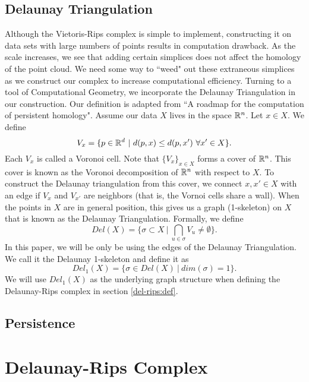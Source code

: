 \documentclass[letterpaper,titlepage]{article}
\begin{document}
\subsection{Delaunay Triangulation}
Although the Vietoris-Rips complex is simple to implement, constructing it on data sets with large numbers of points results in computation drawback. As the scale increases, we see that adding certain simplices does not affect the homology of the point cloud. We need some way to ``weed" out these extraneous simplices as we construct our complex to increase computational efficiency. Turning to a tool of Computational Geometry, we incorporate the Delaunay Triangulation in our construction. Our definition is adapted from ``A roadmap for the computation of persistent homology"\cite{Roadmap}. Assume our data $X$ lives in the space $\mathbb{R}^n$. Let $x \in X$. We define
$$V_x = \{p \in \mathbb{R}^d\ |\ d(p,x) \leq d(p, x')\ \forall x' \in X\}.$$
Each $V_x$ is called a Voronoi cell. Note that $\{V_x\}_{x \in X}$ forms a cover of $\mathbb{R}^n$. This cover is known as the Voronoi decomposition of $\mathbb{R}^n$ with respect to $X$. To construct the Delaunay triangulation from this cover, we connect $x,x' \in X$ with an edge if $V_x$ and $V_{x'}$ are neighbors (that is, the Vornoi cells share a wall). When the points in $X$ are in general position, this gives us a graph (1-skeleton) on $X$ that is known as the Delaunay Triangulation. Formally, we define \cite{Edelsbrunner}
$$Del(X) = \{\sigma \subset X\ |\ \bigcap_{u \in \sigma} V_u \neq \emptyset\}.$$
In this paper, we will be only be using the edges of the Delaunay Triangulation. We call it the Delaunay 1-skeleton and define it as
$$Del_{1}(X) = \{\sigma \in Del(X)\ |\ dim(\sigma) = 1\}.$$
We will use $Del_1(X)$ as the underlying graph structure when defining the Delaunay-Rips complex in section \ref{del-rips:def}.

\subsection{Persistence}


\section{Delaunay-Rips Complex}
\end{document}
